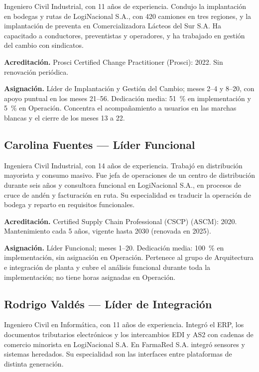 Ingeniero Civil Industrial, con 11 años de experiencia. Condujo la implantación en bodegas y rutas de LogiNacional S.A., con 420 camiones en tres regiones, y la implantación de preventa en Comercializadora Lácteos del Sur S.A. Ha capacitado a conductores, preventistas y operadores, y ha trabajado en gestión del cambio con sindicatos.

\textbf{Acreditación.} Prosci Certified Change Practitioner (Prosci): 2022. Sin renovación periódica.

\textbf{Asignación.} Líder de Implantación y Gestión del Cambio; meses 2--4 y 8--20, con apoyo puntual en los meses 21--56. Dedicación media: 51~\% en implementación y 5~\% en Operación. Concentra el acompañamiento a usuarios en las marchas blancas y el cierre de los meses 13 a 22.

\subsection{Carolina Fuentes — Líder Funcional}

Ingeniera Civil Industrial, con 14 años de experiencia. Trabajó en distribución mayorista y consumo masivo. Fue jefa de operaciones de un centro de distribución durante seis años y consultora funcional en LogiNacional S.A., en procesos de cruce de andén y facturación en ruta. Su especialidad es traducir la operación de bodega y reparto en requisitos funcionales.

\textbf{Acreditación.} Certified Supply Chain Professional (CSCP) (ASCM): 2020. Mantenimiento cada 5 años, vigente hasta 2030 (renovada en 2025).

\textbf{Asignación.} Líder Funcional; meses 1--20. Dedicación media: 100~\% en implementación, sin asignación en Operación. Pertenece al grupo de Arquitectura e integración de planta y cubre el análisis funcional durante toda la implementación; no tiene horas asignadas en Operación.

\subsection{Rodrigo Valdés — Líder de Integración}

Ingeniero Civil en Informática, con 11 años de experiencia. Integró el ERP, los documentos tributarios electrónicos y los intercambios EDI y AS2 con cadenas de comercio minorista en LogiNacional S.A. En FarmaRed S.A. integró sensores y sistemas heredados. Su especialidad son las interfaces entre plataformas de distinta generación.


